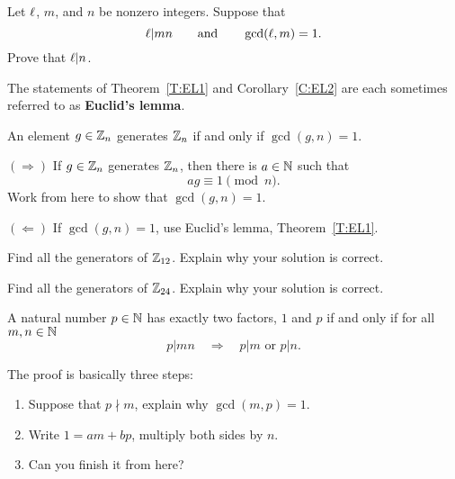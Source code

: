 \documentclass{ximera}
\begin{document}
\begin{corollary}\label{C:EL2}
  Let $\ell$, $m$, and $n$ be nonzero integers. Suppose that 
  \[
  \ell|mn\qquad\text{and}\qquad \gcd(\ell,m)=1.
  \]
  Prove that $\ell|n$. 
\end{corollary}


The statements of Theorem~\ref{T:EL1} and Corollary~\ref{C:EL2} are
each sometimes referred to as \textbf{Euclid's lemma}.




\begin{corollary}
  An element $g\in \mathbb Z_n$ generates $\mathbb Z_n$ if and only if $\gcd(g,n) =
  1$.
  \begin{sketch}
    $(\Rightarrow)$ If $g\in\mathbb Z_n$ generates $\mathbb Z_n$, then there is
    $a\in\mathbb N$ such that
    \[
    ag \equiv 1\pmod{n}.
    \]
    Work from here to show that $\gcd(g,n) = 1$.
    

    $(\Leftarrow)$ If $\gcd(g,n) = 1$, use Euclid's lemma,
    Theorem~\ref{T:EL1}.
  \end{sketch}
\end{corollary}

\begin{exercise}
  Find all the generators of $\mathbb Z_{12}$. Explain why your solution is correct.
\end{exercise}


\begin{exercise}
  Find all the generators of $\mathbb Z_{24}$. Explain why your solution is correct.
\end{exercise}





\begin{corollary}\label{E:EL}
  A natural number $p\in \mathbb N$ has exactly two factors, $1$ and $p$ if
  and only if for all $m,n\in\mathbb N$
  \[
  p|mn \quad \Rightarrow \quad p|m \text{ or } p|n.
  \]
  \begin{sketch}
    The proof is basically three steps:
    \begin{enumerate}
    \item Suppose that $p\nmid m$, explain why $\gcd(m,p) =1$.
    \item Write $1 = am + bp$, multiply both sides by $n$.
    \item Can you finish it from here?
    \end{enumerate}
  \end{sketch}
\end{corollary}
\end{document}
